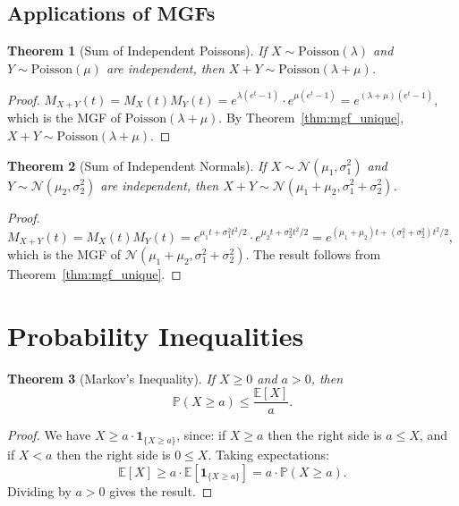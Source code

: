 \documentclass[11pt,a4paper]{article}
\theoremstyle{definition}
\theoremstyle{plain}
\newtheorem{theorem}{Theorem}[section]
\theoremstyle{remark}
\newcommand{\E}{\mathbb{E}}
\newcommand{\Prob}{\mathbb{P}}
\newcommand{\indicator}{\mathbf{1}}
\begin{document}
\subsection{Applications of MGFs}

\begin{theorem}[Sum of Independent Poissons]
\label{thm:sum_poisson}
If $X \sim \mathrm{Poisson}(\lambda)$ and $Y \sim \mathrm{Poisson}(\mu)$ are independent,
then $X + Y \sim \mathrm{Poisson}(\lambda + \mu)$.
\end{theorem}

\begin{proof}
$M_{X+Y}(t) = M_X(t)M_Y(t) = e^{\lambda(e^t-1)} \cdot e^{\mu(e^t-1)}
= e^{(\lambda+\mu)(e^t-1)}$,
which is the MGF of $\mathrm{Poisson}(\lambda + \mu)$. By
Theorem~\ref{thm:mgf_unique}, $X + Y \sim \mathrm{Poisson}(\lambda + \mu)$.
\end{proof}

\begin{theorem}[Sum of Independent Normals]
\label{thm:sum_normal}
If $X \sim \mathcal{N}(\mu_1, \sigma_1^2)$ and $Y \sim \mathcal{N}(\mu_2, \sigma_2^2)$
are independent, then $X + Y \sim \mathcal{N}(\mu_1 + \mu_2, \sigma_1^2 + \sigma_2^2)$.
\end{theorem}

\begin{proof}
$M_{X+Y}(t) = M_X(t)M_Y(t) = e^{\mu_1 t + \sigma_1^2 t^2/2} \cdot
e^{\mu_2 t + \sigma_2^2 t^2/2} = e^{(\mu_1+\mu_2)t + (\sigma_1^2+\sigma_2^2)t^2/2}$,
which is the MGF of $\mathcal{N}(\mu_1 + \mu_2, \sigma_1^2 + \sigma_2^2)$. The result
follows from Theorem~\ref{thm:mgf_unique}.
\end{proof}

\section{Probability Inequalities}
\label{sec:inequalities}

\begin{theorem}[Markov's Inequality]
\label{thm:markov}
If $X \geq 0$ and $a > 0$, then
\[
    \Prob(X \geq a) \leq \frac{\E[X]}{a}.
\]
\end{theorem}

\begin{proof}
We have $X \geq a \cdot \indicator_{\{X \geq a\}}$, since: if $X \geq a$ then the right
side is $a \leq X$, and if $X < a$ then the right side is $0 \leq X$. Taking expectations:
\[
    \E[X] \geq a \cdot \E[\indicator_{\{X \geq a\}}] = a \cdot \Prob(X \geq a).
\]
Dividing by $a > 0$ gives the result.
\end{proof}
\end{document}
